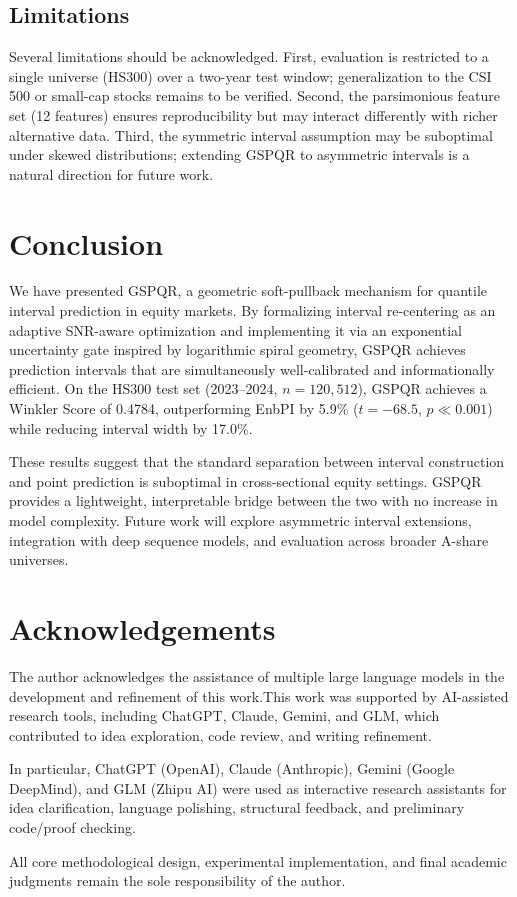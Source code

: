 \documentclass[12pt, a4paper]{article}
\begin{document}
\subsection{Limitations}

Several limitations should be acknowledged. First, evaluation is restricted to a
single universe (HS300) over a two-year test window; generalization to the CSI 500 or
small-cap stocks remains to be verified. Second, the parsimonious feature set (12
features) ensures reproducibility but may interact differently with richer alternative
data. Third, the symmetric interval assumption may be suboptimal under skewed
distributions; extending GSPQR to asymmetric intervals is a natural direction for
future work.

\section{Conclusion}

We have presented GSPQR, a geometric soft-pullback mechanism for quantile interval
prediction in equity markets. By formalizing interval re-centering as an adaptive
SNR-aware optimization and implementing it via an exponential uncertainty gate inspired
by logarithmic spiral geometry, GSPQR achieves prediction intervals that are
simultaneously well-calibrated and informationally efficient. On the HS300 test set
(2023--2024, $n = 120{,}512$), GSPQR achieves a Winkler Score of 0.4784, outperforming
EnbPI by 5.9\% ($t = -68.5$, $p \ll 0.001$) while reducing interval width by 17.0\%.

These results suggest that the standard separation between interval construction and
point prediction is suboptimal in cross-sectional equity settings. GSPQR provides a
lightweight, interpretable bridge between the two with no increase in model complexity.
Future work will explore asymmetric interval extensions, integration with deep sequence
models, and evaluation across broader A-share universes.


\section*{Acknowledgements}

The author acknowledges the assistance of multiple large language models in the development and refinement of this work.This work was supported by AI-assisted research tools, including ChatGPT, Claude, Gemini, and GLM, which contributed to idea exploration, code review, and writing refinement.

In particular, ChatGPT (OpenAI), Claude (Anthropic), Gemini (Google DeepMind), and GLM (Zhipu AI) were used as interactive research assistants for idea clarification, language polishing, structural feedback, and preliminary code/proof checking.

All core methodological design, experimental implementation, and final academic judgments remain the sole responsibility of the author.



\end{document}
